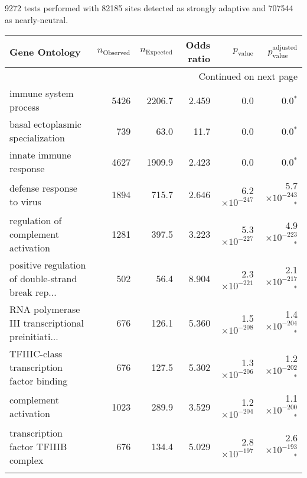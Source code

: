 9272 tests performed with 82185 sites detected as strongly adaptive and 707544 as nearly-neutral.
\scriptsize
\begin{longtable}{|l|r|r|r|r|r|}
\toprule
                                     Gene Ontology & $n_{\mathrm{Observed}}$ & $n_{\mathrm{Expected}}$ & Odds ratio &      $p_{\mathrm{value}}$ &       $p_{\mathrm{value}}^{\mathrm{adjusted}}$ \\
\midrule
\endhead
\midrule
\multicolumn{6}{r}{{Continued on next page}} \\
\midrule
\endfoot

\bottomrule
\endlastfoot
                             immune system process &                    5426 &                  2206.7 &      2.459 &                   0.0 &                    0.0$\bm{^*}$ \\
                  basal ectoplasmic specialization &                     739 &                    63.0 &       11.7 &                   0.0 &                    0.0$\bm{^*}$ \\
                            innate immune response &                    4627 &                  1909.9 &      2.423 &                   0.0 &                    0.0$\bm{^*}$ \\
                         defense response to virus &                    1894 &                   715.7 &      2.646 & 6.2$\times 10^{-247}$ &  5.7$\times 10^{-243}$$\bm{^*}$ \\
               regulation of complement activation &                    1281 &                   397.5 &      3.223 & 5.3$\times 10^{-227}$ &  4.9$\times 10^{-223}$$\bm{^*}$ \\
 positive regulation of double-strand break rep... &                     502 &                    56.4 &      8.904 & 2.3$\times 10^{-221}$ &  2.1$\times 10^{-217}$$\bm{^*}$ \\
 RNA polymerase III transcriptional preinitiati... &                     676 &                   126.1 &      5.360 & 1.5$\times 10^{-208}$ &  1.4$\times 10^{-204}$$\bm{^*}$ \\
         TFIIIC-class transcription factor binding &                     676 &                   127.5 &      5.302 & 1.3$\times 10^{-206}$ &  1.2$\times 10^{-202}$$\bm{^*}$ \\
                             complement activation &                    1023 &                   289.9 &      3.529 & 1.2$\times 10^{-204}$ &  1.1$\times 10^{-200}$$\bm{^*}$ \\
               transcription factor TFIIIB complex &                     676 &                   134.4 &      5.029 & 2.8$\times 10^{-197}$ &  2.6$\times 10^{-193}$$\bm{^*}$ \\
$$
\end{longtable}
